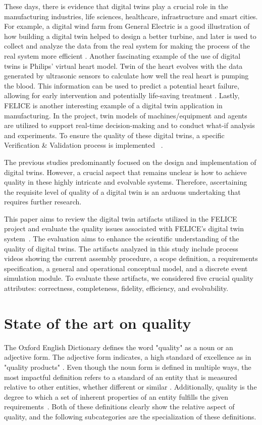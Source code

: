 \documentclass{llncs}
\begin{document}
    These days, there is evidence that digital twins play a crucial role in the manufacturing industries, 
    life sciences, healthcare, infrastructure and smart cities\cite{Review2}.
    For example, a digital wind farm from General Electric is a good illustration of how building a digital twin helped to design a better turbine, 
    and later is used to collect and analyze the data from the real system for making the process of the real system more efficient \cite{GeneralElectricWindTurbine}. 
    Another fascinating example of the use of digital twins is Philips' virtual heart model. Twin of the heart evolves with the  data generated by ultrasonic sensors to calculate 
    how well the real heart is pumping the blood. This information can be used to predict a potential heart failure, allowing for early intervention and potentially life-saving treatment \cite{PhilipsHearth}. 
    Lastly, FELICE is another interesting example of a digital twin application in manufacturing. In the project, twin models of machines/equipment and 
    agents are utilized to support real-time decision-making and to conduct what-if analysis and experiments. To ensure the quality of these digital twins, a specific Verification \& Validation process is implemented ~\cite{FELICE}.
    
    The previous studies predominantly focused on the design and implementation of digital twins\cite{Review1, Review2}. 
    However, a crucial aspect that remains unclear is how to achieve quality in these highly intricate and evolvable systems. 
    Therefore, ascertaining the requisite level of quality of a digital twin is an arduous undertaking that requires further research.

    This paper aims to review the digital twin artifacts utilized in the FELICE project and evaluate the quality issues associated with FELICE's digital twin system~\cite{FELICE}. 
    The evaluation aims to enhance the scientific understanding of the quality of digital twins. The artifacts analyzed in this study include process videos showing the current assembly procedure, 
    a scope definition, a requirements specification, a general and operational conceptual model, and a discrete event simulation module. 
    To evaluate these artifacts, we considered five crucial quality attributes: correctness, completeness, fidelity, efficiency, and evolvability.

    \section{State of the art on quality}
    The Oxford English Dictionary defines the word "quality" as a noun or an adjective form. The adjective form indicates, 
    a high standard of excellence as in  "quality products" \cite{OxfordDictionary}. Even though the noun form is defined in multiple ways, the most impactful 
    definition refers to a  standard of an entity that is measured relative to other entities, whether different or similar \cite{OxfordDictionary}.  
    Additionally, quality is the degree to which a set of inherent properties of an entity fulfills the given requirements~\cite{ISO9000}.
    Both of these definitions clearly show the relative aspect of quality, and the following subcategories are the specialization of these definitions.
\end{document}
